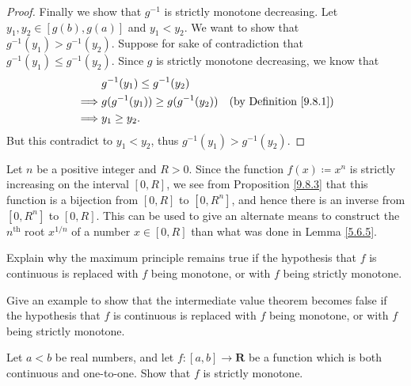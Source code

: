 \begin{proof}
    Finally we show that \(g^{-1}\) is strictly monotone decreasing.
    Let \(y_1, y_2 \in [g(b), g(a)]\) and \(y_1 < y_2\).
    We want to show that \(g^{-1}(y_1) > g^{-1}(y_2)\).
    Suppose for sake of contradiction that \(g^{-1}(y_1) \leq g^{-1}(y_2)\).
    Since \(g\) is strictly monotone decreasing, we know that
    \begin{align*}
        & g^{-1}(y_1) \leq g^{-1}(y_2) \\
        \implies & g(g^{-1}(y_1)) \geq g(g^{-1}(y_2)) & \text{(by Definition \ref{9.8.1})} \\
        \implies & y_1 \geq y_2.
    \end{align*}
    But this contradict to \(y_1 < y_2\), thus \(g^{-1}(y_1) > g^{-1}(y_2)\).
\end{proof}

\begin{example}\label{9.8.4}
    Let \(n\) be a positive integer and \(R > 0\).
    Since the function \(f(x) \coloneqq x^n\) is strictly increasing on the interval \([0, R]\), we see from Proposition \ref{9.8.3} that this function is a bijection from \([0, R]\) to \([0, R^n]\), and hence there is an inverse from \([0, R^n]\) to \([0, R]\).
    This can be used to give an alternate means to construct the \(n^\text{th}\) root \(x^{1 / n}\) of a number \(x \in [0, R]\) than what was done in Lemma \ref{5.6.5}.
\end{example}

\exercisesection

\begin{exercise}\label{ex 9.8.1}
    Explain why the maximum principle remains true if the hypothesis that \(f\) is continuous is replaced with \(f\) being monotone, or with \(f\) being strictly monotone.
\end{exercise}

\begin{exercise}\label{ex 9.8.2}
    Give an example to show that the intermediate value theorem becomes false if the hypothesis that \(f\) is continuous is replaced with \(f\) being monotone, or with \(f\) being strictly monotone.
\end{exercise}

\begin{exercise}\label{ex 9.8.3}
    Let \(a < b\) be real numbers, and let \(f : [a, b] \to \mathbf{R}\) be a function which is both continuous and one-to-one.
    Show that \(f\) is strictly monotone.
\end{exercise}

